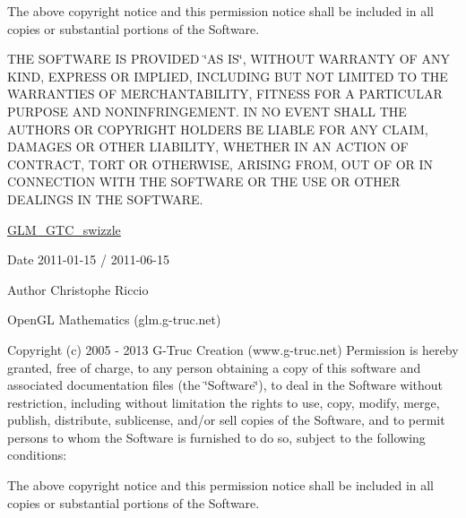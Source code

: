 The above copyright notice and this permission notice shall be included in all copies or substantial portions of the Software.

T\+H\+E S\+O\+F\+T\+W\+A\+R\+E I\+S P\+R\+O\+V\+I\+D\+E\+D \char`\"{}\+A\+S I\+S\char`\"{}, W\+I\+T\+H\+O\+U\+T W\+A\+R\+R\+A\+N\+T\+Y O\+F A\+N\+Y K\+I\+N\+D, E\+X\+P\+R\+E\+S\+S O\+R I\+M\+P\+L\+I\+E\+D, I\+N\+C\+L\+U\+D\+I\+N\+G B\+U\+T N\+O\+T L\+I\+M\+I\+T\+E\+D T\+O T\+H\+E W\+A\+R\+R\+A\+N\+T\+I\+E\+S O\+F M\+E\+R\+C\+H\+A\+N\+T\+A\+B\+I\+L\+I\+T\+Y, F\+I\+T\+N\+E\+S\+S F\+O\+R A P\+A\+R\+T\+I\+C\+U\+L\+A\+R P\+U\+R\+P\+O\+S\+E A\+N\+D N\+O\+N\+I\+N\+F\+R\+I\+N\+G\+E\+M\+E\+N\+T. I\+N N\+O E\+V\+E\+N\+T S\+H\+A\+L\+L T\+H\+E A\+U\+T\+H\+O\+R\+S O\+R C\+O\+P\+Y\+R\+I\+G\+H\+T H\+O\+L\+D\+E\+R\+S B\+E L\+I\+A\+B\+L\+E F\+O\+R A\+N\+Y C\+L\+A\+I\+M, D\+A\+M\+A\+G\+E\+S O\+R O\+T\+H\+E\+R L\+I\+A\+B\+I\+L\+I\+T\+Y, W\+H\+E\+T\+H\+E\+R I\+N A\+N A\+C\+T\+I\+O\+N O\+F C\+O\+N\+T\+R\+A\+C\+T, T\+O\+R\+T O\+R O\+T\+H\+E\+R\+W\+I\+S\+E, A\+R\+I\+S\+I\+N\+G F\+R\+O\+M, O\+U\+T O\+F O\+R I\+N C\+O\+N\+N\+E\+C\+T\+I\+O\+N W\+I\+T\+H T\+H\+E S\+O\+F\+T\+W\+A\+R\+E O\+R T\+H\+E U\+S\+E O\+R O\+T\+H\+E\+R D\+E\+A\+L\+I\+N\+G\+S I\+N T\+H\+E S\+O\+F\+T\+W\+A\+R\+E.

\hyperlink{group__gtc__swizzle}{G\+L\+M\+\_\+\+G\+T\+C\+\_\+swizzle}

\begin{DoxyDate}{Date}
2011-\/01-\/15 / 2011-\/06-\/15 
\end{DoxyDate}
\begin{DoxyAuthor}{Author}
Christophe Riccio
\end{DoxyAuthor}
Open\+G\+L Mathematics (glm.\+g-\/truc.\+net)

Copyright (c) 2005 -\/ 2013 G-\/\+Truc Creation (www.\+g-\/truc.\+net) Permission is hereby granted, free of charge, to any person obtaining a copy of this software and associated documentation files (the \char`\"{}\+Software\char`\"{}), to deal in the Software without restriction, including without limitation the rights to use, copy, modify, merge, publish, distribute, sublicense, and/or sell copies of the Software, and to permit persons to whom the Software is furnished to do so, subject to the following conditions\+:

The above copyright notice and this permission notice shall be included in all copies or substantial portions of the Software.

